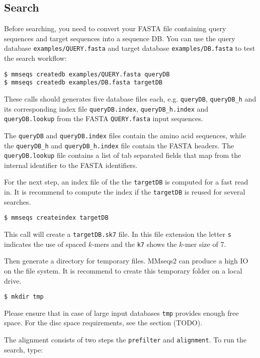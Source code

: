 \documentclass[11pt,a4paper]{scrreprt}
\begin{document}
\subsection*{Search}
Before searching, you need to convert your FASTA file containing query sequences and target sequences into a sequence DB. You can use the query database \texttt{examples/QUERY.fasta} and target database \texttt{examples/DB.fasta} to test the search workflow:


\begin{verbatim}
$ mmseqs createdb examples/QUERY.fasta queryDB
$ mmseqs createdb examples/DB.fasta targetDB
\end{verbatim}
 
These calls should generates five database files each, e.g. \texttt{queryDB}, \texttt{queryDB\_h} and its corresponding index file \texttt{queryDB.index}, \texttt{queryDB\_h.index} and \texttt{queryDB.lookup} from the FASTA \texttt{QUERY.fasta} input sequences.


The \texttt{queryDB} and \texttt{queryDB.index} files contain the amino acid sequences, while the \texttt{queryDB\_h} and \texttt{queryDB\_h.index} file contain the FASTA headers. The \texttt{queryDB.lookup} file contains a list of tab separated fields that map from the internal identifier to the FASTA identifiers.


For the next step, an index file of the the \texttt{targetDB} is computed for a fast read in. It is recommend to compute the index if the \texttt{targetDB} is reused for several searches.


\begin{verbatim}
$ mmseqs createindex targetDB
\end{verbatim}


This call will create a \texttt{targetDB.sk7} file. In this file extension the letter \texttt{s} indicates the use of spaced $k$-mers and the \texttt{k7} shows the $k$-mer size of 7.


Then generate a directory for temporary files. MMseqs2 can produce a high IO on the file system. It is recommend to create this temporary folder on a local drive.


\begin{verbatim}
$ mkdir tmp
\end{verbatim}


Please ensure that in case of large input databases \texttt{tmp} provides enough free space. For the disc space requirements, see the section (TODO).


The alignment consists of two steps the \texttt{prefilter} and \texttt{alignment}. To run the search, type:
\end{document}
